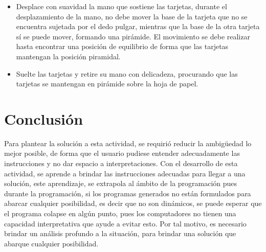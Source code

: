 \documentclass{article}
\begin{document}
\begin{itemize}
    \item Desplace con suavidad la mano que sostiene las tarjetas, durante el desplazamiento de la mano, no debe mover la base de la tarjeta que no se encuentra sujetada por el dedo pulgar, mientras que la base de la otra tarjeta sí se puede mover, formando una pirámide. El movimiento se debe realizar hasta encontrar una posición de equilibrio de forma que las tarjetas mantengan la posición piramidal.
    \item Suelte las tarjetas y retire su mano con delicadeza, procurando que las tarjetas se mantengan en pirámide sobre la hoja de papel.
\end{itemize}


\section{Conclusión} \label{conclusiones}
Para plantear la solución a esta actividad, se requirió reducir la ambigüedad lo mejor posible, de forma que el usuario pudiese entender adecuadamente las instrucciones y no dar espacio a interpretaciones. Con el desarrollo de esta actividad, se aprende a brindar las instrucciones adecuadas para llegar a una solución, este aprendizaje, se extrapola al ámbito de la programación pues durante la programación, si los programas generados no están formulados para abarcar cualquier posibilidad, es decir que no son dinámicos, se puede esperar que el programa colapse en algún punto, pues los computadores no tienen una capacidad interpretativa que ayude a evitar esto. Por tal motivo, es necesario brindar un análisis profundo a la situación, para brindar una solución que abarque cualquier posibilidad.  
\end{document}
